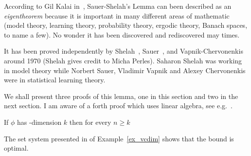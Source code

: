 \documentclass[sputnik.tex]{subfiles}
\begin{document}
According to Gil Kalai in~\cite{kalai}, Sauer-Shelah's Lemma can been described as an \textit{eigentheorem\/} because it is important in many different areas of mathematic (model theory, learning theory, probability theory, ergodic theory, Banach spaces, to name a few).
No wonder it has been discovered and rediscovered may times.

It has been proved independently by Shelah~\cite{shelah72}, Sauer~\cite{sauer}, and Vapnik-Cher\-vo\-nen\-kis~\cite{VC} around 1970 (Shelah gives credit to Micha Perles).
Saharon Shelah was working in model theory while Norbert Sauer, Vladimir Vapnik and Alexey Chervonenkis were in statistical learning theory.

We shall present three proofs of this lemma, one in this section and two in the next section. I am aware of a forth proof which uses linear algebra, see e.g.~\cite{gowers}. 

\begin{proposition}\label{prop_Sauer}
If $\phi$ has \vc-dimension $k$ then for every $n\ge k$

\end{proposition}

The set system presented in  of Example~\ref{ex_vcdim} shows that the bound is optimal.
\end{document}
